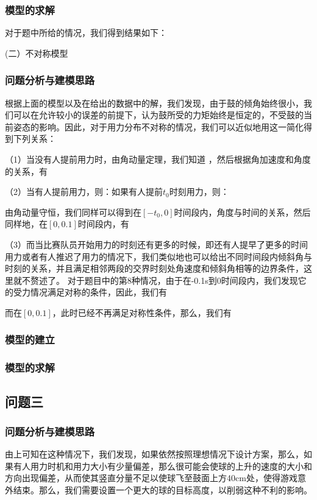 \documentclass[withoutpreface,bwprint]{cumcmthesis} %
\begin{document}
	\subsubsection{模型的求解}
对于题中所给的情况，我们得到结果如下：
\par 


(二）不对称模型
\subsubsection{问题分析与建模思路}
根据上面的模型以及在给出的数据中的解，我们发现，由于鼓的倾角始终很小，我们可以在允许较小的误差的前提下，认为鼓所受的力矩始终是恒定的，不受鼓的当前姿态的影响。因此，对于用力分布不对称的情况，我们可以近似地用这一简化得到下列关系：\par
（1）当没有人提前用力时，由角动量定理，我们知道  ，然后根据角加速度和角度的关系，有\par
（2）当有人提前用力，则：如果有人提前$t_0$时刻用力，则：\par
由角动量守恒，我们同样可以得到在$\left [ -t_0,0 \right ]$时间段内，角度与时间的关系，然后同样地，在$\left [ 0,0.1 \right ]$时间段内，有\par
（3）而当比赛队员开始用力的时刻还有更多的时候，即还有人提早了更多的时间用力或者有人推迟了用力的情况下，我们类似地也可以给出不同时间段内倾斜角与时刻的关系，并且满足相邻两段的交界时刻处角速度和倾斜角相等的边界条件，这里就不赘述了。
对于题目中的第8种情况，由于在-0.1s到0时间段内，我们发现它的受力情况满足对称的条件，因此，我们有\par
而在$\left [ 0,0.1 \right ]$，此时已经不再满足对称性条件，那么，我们有\par

	\subsubsection{模型的建立}


	\subsubsection{模型的求解}





 
\subsection{问题三}
	\subsubsection{问题分析与建模思路}
由上可知在这种情况下，我们发现，如果依然按照理想情况下设计方案，那么，如果有人用力时机和用力大小有少量偏差，那么很可能会使球的上升的速度的大小和方向出现偏差，从而使其竖直分量不足以使球飞至鼓面上方40cm处，使得游戏意外结束。那么，我们需要设置一个更大的球的目标高度，以削弱这种不利的影响。
\end{document}
